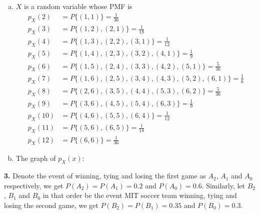 \documentclass[a4paper,12pt]{article}
\newcommand{\exercise}[1]{\noindent\textbf{#1.}}
\begin{document}
\begin{enumerate}[(a)]
  \item $X$ is a random variable whose PMF is
    \begin{align*}
      p_X(2) &= P\{(1,1)\} = \frac{1}{36}\\
      p_X(3) &= P\{(1,2), (2,1)\} = \frac{1}{18}\\
      p_X(4) &= P\{(1,3), (2,2), (3,1)\} = \frac{1}{12}\\
      p_X(5) &= P\{(1,4), (2,3), (3,2), (4,1)\} = \frac{1}{9}\\
      p_X(6) &= P\{(1,5), (2,4), (3,3), (4,2), (5,1)\} = \frac{5}{36}\\
      p_X(7) &= P\{(1,6), (2,5), (3,4), (4,3), (5,2), (6,1)\} = \frac{1}{6}\\
      p_X(8) &= P\{(2,6), (3,5), (4,4), (5,3), (6,2)\} = \frac{5}{36}\\
      p_X(9) &= P\{(3,6), (4,5), (5,4), (6,3)\} = \frac{1}{9}\\
      p_X(10) &= P\{(4,6), (5,5), (6,4)\} = \frac{1}{12}\\
      p_X(11) &= P\{(5,6), (6,5)\} = \frac{1}{18}\\
      p_X(12) &= P\{(6,6)\} = \frac{1}{36}
    \end{align*}
  \item The graph of $p_X(x)$:

\end{enumerate}
\pagebreak

\exercise 3  Denote the event of winning, tying and losing the first game as
$A_2$, $A_1$ and $A_0$ respectively, we get $P(A_2) = P(A_1) = 0.2$
and $P(A_0) = 0.6$.  Similarly, let $B_2$, $B_1$ and $B_0$ in that order
be the event MIT soccer team winning, tying and losing the second game,
we get $P(B_2) = P(B_1) = 0.35$ and $P(B_0) = 0.3$.
\end{document}
